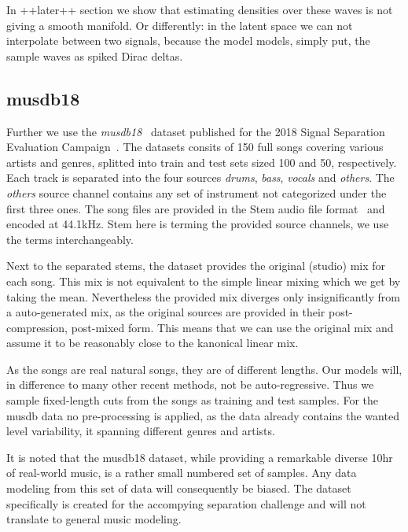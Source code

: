 In ++later++ section we show that estimating densities over these waves is not giving a smooth manifold. Or differently: in the latent space we can not interpolate between two signals, because the model models, simply put, the sample waves as spiked Dirac deltas.


\subsection{musdb18}
Further we use the \emph{musdb18}~\cite{rafiiMUSDB182017} dataset published for the 2018 Signal Separation Evaluation Campaign~\cite{stoter20182018}. The datasets consits of 150 full songs covering various artists and genres, splitted into train and test sets sized 100 and 50, respectively. Each track is separated into the four sources \emph{drums}, \emph{bass}, \emph{vocals} and \emph{others}. The \emph{others} source channel contains any set of instrument not categorized under the first three ones. The song files are provided in the Stem audio file format~\cite{nativeinstrumentsStem} and encoded at 44.1kHz. Stem here is terming the provided source channels, we use the terms interchangeably.

Next to the separated stems, the dataset provides the original (studio) mix for each song. This mix is not equivalent to the simple linear mixing which we get by taking the mean. Nevertheless the provided mix diverges only insignificantly from a auto-generated mix, as the original sources are provided in their post-compression, post-mixed form. This means that we can use the original mix and assume it to be reasonably close to the kanonical linear mix.

As the songs are real natural songs, they are of different lengths. Our models will, in difference to many other recent methods, not be auto-regressive. Thus we sample fixed-length cuts from the songs as training and test samples. For the musdb data no pre-processing is applied, as the data already contains the wanted level variability, it spanning different genres and artists.

It is noted that the musdb18 dataset, while providing a remarkable diverse 10hr of real-world music, is a rather small numbered set of samples. Any data modeling from this set of data will consequently be biased. The dataset specifically is created for the accompying separation challenge and will not translate to general music modeling.
